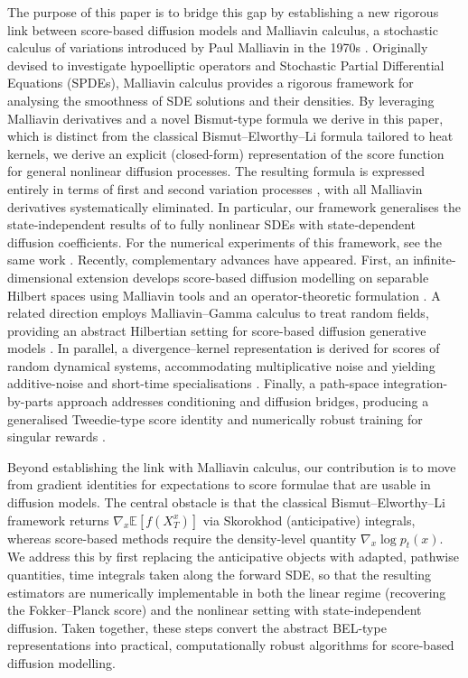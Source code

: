 \documentclass[]{interact}
\newcommand{\1}{\mathbf{1}}
\theoremstyle{plain}%
\theoremstyle{definition}
\theoremstyle{remark}
\numberwithin{equation}{section}
\begin{document}
The purpose of this paper is to bridge this gap by establishing a new rigorous link between score-based diffusion models and Malliavin calculus, a stochastic calculus of variations introduced by Paul Malliavin in the 1970s \cite{malliavin:78:stochastic, 10.5555/262387}. Originally devised to investigate hypoelliptic operators and Stochastic Partial Differential Equations (SPDEs), Malliavin calculus provides a rigorous framework for analysing the smoothness of SDE solutions and their densities. By leveraging Malliavin derivatives and a novel Bismut-type formula we derive in this paper, which is distinct from the classical Bismut--Elworthy--Li formula \cite{alma990005308880204808,ELWORTHY1994252, Elworthy_1982} tailored to heat kernels, we derive an explicit (closed-form) representation of the score function for general nonlinear diffusion processes. The resulting formula is expressed entirely in terms of first and second variation processes \cite{kunita1997stochastic, bismut1981martingales}, with all Malliavin derivatives systematically eliminated.
%
In particular, our framework generalises the state‐independent results of \cite{mirafzali2025malliavincalculusscorebaseddiffusion} to fully nonlinear SDEs with state‐dependent diffusion coefficients. For the numerical experiments of this framework, see the same work \cite{mirafzali2025malliavincalculusscorebaseddiffusion}. Recently, complementary advances have appeared. First, an infinite-dimensional extension develops score-based diffusion modelling on separable Hilbert spaces using Malliavin tools and an operator-theoretic formulation \cite{mirafzali2025scorebaseddiffusionmodelsinfinite}. A related direction employs Malliavin–Gamma calculus to treat random fields, providing an abstract Hilbertian setting for score-based diffusion generative models \cite{greco2025malliavingammacalculusapproachscore}. In parallel, a divergence–kernel representation is derived for scores of random dynamical systems, accommodating multiplicative noise and yielding additive-noise and short-time specialisations \cite{ni2025divergencekernelmethodscoresrandom}. Finally, a path-space integration-by-parts approach addresses conditioning and diffusion bridges, producing a generalised Tweedie-type score identity and numerically robust training for singular rewards \cite{pidstrigach2025conditioning}.


Beyond establishing the link with Malliavin calculus, our contribution is to move from gradient identities for expectations to score formulae that are usable in diffusion models. The central obstacle is that the classical Bismut--Elworthy--Li framework returns \( \nabla_x \mathbb{E}[f(X_T^x)] \) via Skorokhod (anticipative) integrals, whereas score-based methods require the density-level quantity \( \nabla_x \log p_t(x) \). We address this by first replacing the anticipative objects with adapted, pathwise quantities, time integrals taken along the forward SDE, so that the resulting estimators are numerically implementable in both the linear regime (recovering the Fokker--Planck score) and the nonlinear setting with state-independent diffusion. Taken together, these steps convert the abstract BEL-type representations into practical, computationally robust algorithms for score-based diffusion modelling.
\end{document}
